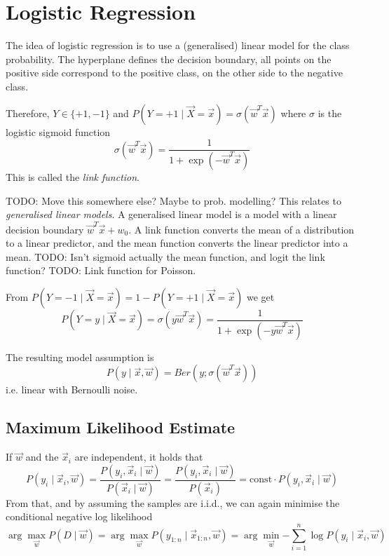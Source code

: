 \section{Logistic Regression}
The idea of logistic regression is to use a
(generalised) linear model for the class
probability.
The hyperplane defines the decision boundary,
all points on the positive side correspond
to the positive class, on the other side
to the negative class.

Therefore, $Y \in \{+1, -1\}$ and
$P(Y = +1 \mid \vec{X} = \vec{x}) = \sigma(\vec{w}^T \vec{x})$
where $\sigma$ is the logistic sigmoid function
\begin{equation*}
    \sigma(\vec{w}^T \vec{x})
    = \frac{1}{1 + \exp{(-\vec{w}^T \vec{x})}}
\end{equation*}
This is called the \emph{link function}.

TODO: Move this somewhere else? Maybe to prob. modelling?
This relates to \emph{generalised linear models}.
A generalised linear model is a model with
a linear decision boundary $\vec{w}^T \vec{x} + w_0$.
A link function converts the mean
of a distribution to a linear predictor,
and the mean function converts the linear
predictor into a mean.
TODO: Isn't sigmoid actually the mean function,
and logit the link function?
TODO: Link function for Poisson.

From $P(Y = -1 \mid \vec{X} = \vec{x}) = 1 - P(Y = +1 \mid \vec{X} = \vec{x})$ we get
\begin{equation*}
    P(Y = y \mid \vec{X} = \vec{x})
    = \sigma(y \vec{w}^T \vec{x})
    = \frac{1}{1 + \exp{(-y \vec{w}^T \vec{x})}}
\end{equation*}

The resulting model assumption is
\begin{equation*}
    P(y \mid \vec{x}, \vec{w}) = Ber(y; \sigma(\vec{w}^T \vec{x}))
\end{equation*}
i.e. linear with Bernoulli noise.


\subsection{Maximum Likelihood Estimate}
If $\vec{w}$ and the $\vec{x}_i$ are independent,
it holds that
\begin{equation*}
    P(y_i \mid \vec{x}_i, \vec{w})
    = \frac{P(y_i, \vec{x}_i \mid \vec{w})}{P(\vec{x}_i \mid \vec{w})}
    = \frac{P(y_i, \vec{x}_i \mid \vec{w})}{P(\vec{x}_i)}
    = \text{const} \cdot P(y_i, \vec{x}_i \mid \vec{w})
\end{equation*}
From that, and by assuming the samples are i.i.d.,
we can again minimise the conditional negative log likelihood
\begin{equation*}
    \arg\max_{\vec{w}}{P(D \mid \vec{w})}
    = \arg\max_{\vec{w}}{P(y_{1:n} \mid \vec{x}_{1:n}, \vec{w})}
    = \arg\min_{\vec{w}}{-\sum_{i=1}^n{
        \log{P(y_i \mid \vec{x}_i, \vec{w})}
    }}
\end{equation*}

